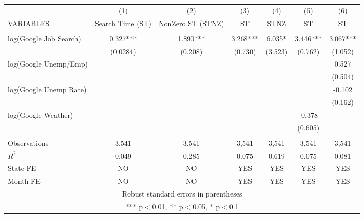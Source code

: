 \begin{center}
\begin{tabular}{lcccccc} \hline
 & (1) & (2) & (3) & (4) & (5) & (6) \\
VARIABLES & Search Time (ST) & NonZero ST (STNZ)  & ST & STNZ  & ST & ST \\ \hline
\vspace{4pt} &  &  &  &  &  &   \\
log(Google Job Search) & 0.327*** & 1.890*** & 3.268*** & 6.035* & 3.446*** & 3.067*** \\
\vspace{4pt} & (0.0284) & (0.208) &  (0.730) & (3.523) & (0.762) & (1.052) \\
log(Google Unemp/Emp) &  &  &  &  &  & 0.527 \\
\vspace{4pt} &  &  &  &  &  & (0.504) \\
log(Google Unemp Rate) &   &  &  &  &  & -0.102 \\
\vspace{4pt} &  &  &  &  &  & (0.162) \\
log(Google Weather) &  &  &  &  & -0.378 &  \\
 &  &  &  &  & (0.605) &  \\
\vspace{4pt} &  &  &  &  &  &  \\
Observations & 3,541 & 3,541 & 3,541 & 3,541 & 3,541 & 3,541 \\
$R^2$ & 0.049 & 0.285  & 0.075 & 0.619  & 0.075 & 0.081 \\
State FE & NO & NO & YES & YES & YES & YES \\
 Month FE & NO & NO & YES & YES & YES & YES \\ \hline
\multicolumn{7}{c}{ Robust standard errors in parentheses} \\
\multicolumn{7}{c}{ *** p$<$0.01, ** p$<$0.05, * p$<$0.1} \\
\end{tabular}
\end{center}
